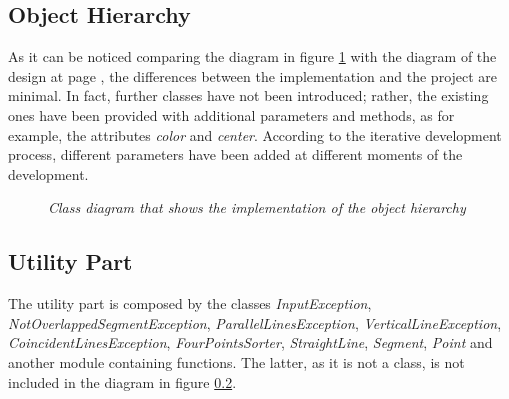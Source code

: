 		\subsection{Object Hierarchy}
		As it can be noticed comparing the diagram in figure \ref{fig:impl_hierarchy} with the diagram of the design at page \pageref{fig:HierarchyDesign}, the differences between the implementation and the project are minimal. 
		In fact, further classes have not been introduced; rather, the existing ones have been provided with additional parameters and methods, as for example, the attributes \emph{color} and \emph{center}.
		According to the iterative development process, different parameters have been added at different moments of the development.
		\begin{figure}[h]
		  \begin{center} 
		  \end{center} 
		  \caption{\textit{Class diagram that shows the implementation of the object hierarchy}}  
		  \label{fig:impl_hierarchy}
	 	\end{figure}

	

		\subsection{Utility Part}
		The utility part is composed by the classes \emph{InputException}, \emph{NotOverlappedSegmentException}, \emph{ParallelLinesException}, \emph{VerticalLineException}, \emph{CoincidentLinesException}, \emph{FourPointsSorter}, \emph{StraightLine}, \emph{Segment}, \emph{Point} and another module containing functions. The latter, as it is not a class, is not included in the diagram in figure \ref{}. 


